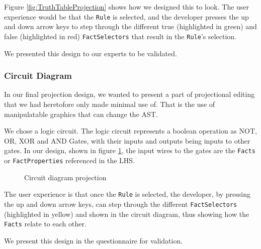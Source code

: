 Figure \ref{fig:TruthTableProjection} shows how we designed this to look.
The user experience would be that the \texttt{Rule} is selected, and the developer presses the up and down arrow keys to step through the different true (highlighted in green) and false (highlighted in red) \texttt{FactSelectors} that result in the \texttt{Rule}'s selection.

We presented this design to our experts to be validated.

\subsubsection{Circuit Diagram}
In our final projection design, we wanted to present a part of projectional editing that we had heretofore only made minimal use of.
That is the use of manipulatable graphics that can change the AST.

We chose a logic circuit. 
The logic circuit represents a boolean operation as NOT, OR, XOR and AND Gates, with their inputs and outputs being inputs to other gates.
In our design, shown in figure \ref{fig:CircuitDiagramProjection}, the input wires to the gates are the \texttt{Facts} or \texttt{FactProperties} referenced in the LHS.

\begin{figure}[h]
    \centering
    \caption{Circuit diagram projection}
    \label{fig:CircuitDiagramProjection}
\end{figure}

The user experience is that once the \texttt{Rule} is selected, the developer, by pressing the up and down arrow keys, can step through the different \texttt{FactSelectors} (highlighted in yellow) and shown in the circuit diagram, thus showing how the \texttt{Facts} relate to each other.

We present this design in the questionnaire for validation.

